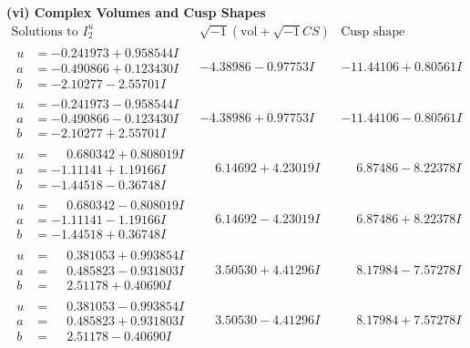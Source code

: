 \documentclass[1p]{elsarticle_modified}
\theoremstyle{definition}
\newcommand{\I}{\sqrt{-1}}
\begin{document}
\newpage\flushleft \textbf{(vi) Complex Volumes and Cusp Shapes}
$$\begin{array}{c|c|c}  
\text{Solutions to }I^u_{2}& \I (\text{vol} + \sqrt{-1}CS) & \text{Cusp shape}\\
 \hline 
\begin{aligned}
u &= -0.241973 + 0.958544 I \\
a &= -0.490866 + 0.123430 I \\
b &= -2.10277 - 2.55701 I\end{aligned}
 & -4.38986 - 0.97753 I & -11.44106 + 0.80561 I \\ \hline\begin{aligned}
u &= -0.241973 - 0.958544 I \\
a &= -0.490866 - 0.123430 I \\
b &= -2.10277 + 2.55701 I\end{aligned}
 & -4.38986 + 0.97753 I & -11.44106 - 0.80561 I \\ \hline\begin{aligned}
u &= \phantom{-}0.680342 + 0.808019 I \\
a &= -1.11141 + 1.19166 I \\
b &= -1.44518 - 0.36748 I\end{aligned}
 & \phantom{-}6.14692 + 4.23019 I & \phantom{-}6.87486 - 8.22378 I \\ \hline\begin{aligned}
u &= \phantom{-}0.680342 - 0.808019 I \\
a &= -1.11141 - 1.19166 I \\
b &= -1.44518 + 0.36748 I\end{aligned}
 & \phantom{-}6.14692 - 4.23019 I & \phantom{-}6.87486 + 8.22378 I \\ \hline\begin{aligned}
u &= \phantom{-}0.381053 + 0.993854 I \\
a &= \phantom{-}0.485823 - 0.931803 I \\
b &= \phantom{-}2.51178 + 0.40690 I\end{aligned}
 & \phantom{-}3.50530 + 4.41296 I & \phantom{-}8.17984 - 7.57278 I \\ \hline\begin{aligned}
u &= \phantom{-}0.381053 - 0.993854 I \\
a &= \phantom{-}0.485823 + 0.931803 I \\
b &= \phantom{-}2.51178 - 0.40690 I\end{aligned}
 & \phantom{-}3.50530 - 4.41296 I & \phantom{-}8.17984 + 7.57278 I \\ \hline\begin{aligned}

\end{aligned}
\end{array}$$
\end{document}
